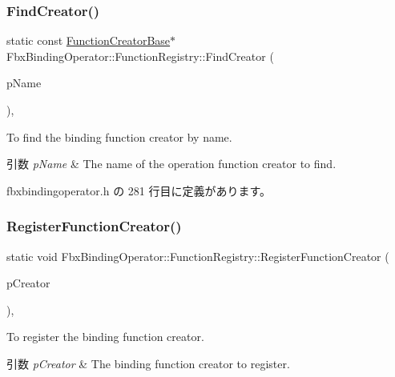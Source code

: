 \subsubsection{\texorpdfstring{Find\+Creator()}{FindCreator()}}
{\footnotesize\ttfamily static const \hyperlink{class_fbx_binding_operator_1_1_function_creator_base}{Function\+Creator\+Base}$\ast$ Fbx\+Binding\+Operator\+::\+Function\+Registry\+::\+Find\+Creator (\begin{DoxyParamCaption}\item[{const char $\ast$}]{p\+Name }\end{DoxyParamCaption})\hspace{0.3cm}{\ttfamily [inline]}, {\ttfamily [static]}}

To find the binding function creator by name. 
\begin{DoxyParams}{引数}
{\em p\+Name} & The name of the operation function creator to find. \\
\hline
\end{DoxyParams}


 fbxbindingoperator.\+h の 281 行目に定義があります。

\mbox{\label{class_fbx_binding_operator_1_1_function_registry_a5ecec300a953a369fb892a46a362e384}} 
\subsubsection{\texorpdfstring{Register\+Function\+Creator()}{RegisterFunctionCreator()}}
{\footnotesize\ttfamily static void Fbx\+Binding\+Operator\+::\+Function\+Registry\+::\+Register\+Function\+Creator (\begin{DoxyParamCaption}\item[{\hyperlink{class_fbx_binding_operator_1_1_function_creator_base}{Function\+Creator\+Base} const \&}]{p\+Creator }\end{DoxyParamCaption})\hspace{0.3cm}{\ttfamily [inline]}, {\ttfamily [static]}}

To register the binding function creator. 
\begin{DoxyParams}{引数}
{\em p\+Creator} & The binding function creator to register. \\
\hline
\end{DoxyParams}


